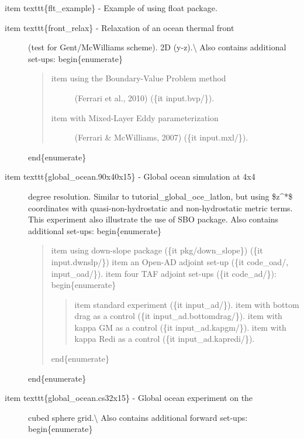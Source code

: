 \documentclass[letterpaper,10pt,english]{sphinxmanual}
\begin{document}
item texttt\{flt\_example\} - Example of using float package.
\begin{description}
\item[{item texttt\{front\_relax\} - Relaxation of an ocean thermal front}] \leavevmode
(test for Gent/McWilliams scheme). 2D (y-z).\textbackslash{}
Also contains additional set-ups:
begin\{enumerate\}
\begin{quote}
\begin{description}
\item[{item using the Boundary-Value Problem method}] \leavevmode
(Ferrari et al., 2010) (\{it input.bvp/\}).

\item[{item with Mixed-Layer Eddy parameterization}] \leavevmode
(Ferrari \& McWilliams, 2007) (\{it input.mxl/\}).

\end{description}
\end{quote}

end\{enumerate\}

\item[{item texttt\{global\_ocean.90x40x15\} - Global ocean simulation at 4x4}] \leavevmode
degree resolution. Similar to tutorial\_global\_oce\_latlon, but using
\$z\textasciicircum{}*\$ coordinates with quasi-non-hydrostatic and non-hydrostatic metric terms.
This experiment also illustrate the use of SBO package.
Also contains additional set-ups:
begin\{enumerate\}
\begin{quote}

item using down-slope package (\{it pkg/down\_slope\}) (\{it input.dwnslp/\})
item an Open-AD adjoint set-up (\{it code\_oad/, input\_oad/\}).
item four TAF adjoint set-ups (\{it code\_ad/\}):
begin\{enumerate\}
\begin{quote}

item standard experiment (\{it input\_ad/\}).
item with bottom drag as a control (\{it input\_ad.bottomdrag/\}).
item with kappa GM as a control (\{it input\_ad.kapgm/\}).
item with kappa Redi as a control (\{it input\_ad.kapredi/\}).
\end{quote}

end\{enumerate\}
\end{quote}

end\{enumerate\}

\item[{item texttt\{global\_ocean.cs32x15\} - Global ocean experiment on the}] \leavevmode
cubed sphere grid.\textbackslash{}
Also contains additional forward set-ups:
begin\{enumerate\}
\begin{quote}


\end{quote}
\end{description}
\end{document}

